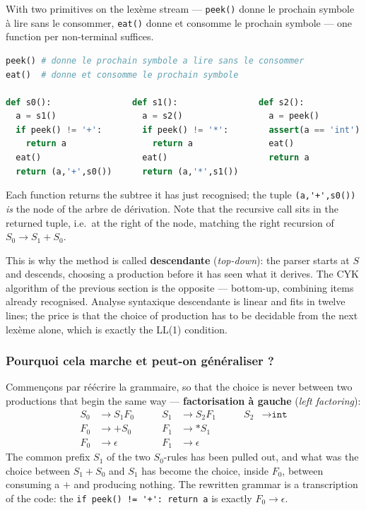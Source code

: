 \begin{example}
  With two primitives on the lexème stream --- \verb|peek()| donne le prochain
  symbole à lire sans le consommer, \verb|eat()| donne et consomme le prochain
  symbole --- one function per non-terminal suffices.

\begin{lstlisting}[language=Python]
peek() # donne le prochain symbole a lire sans le consommer
eat()  # donne et consomme le prochain symbole

def s0():                def s1():                def s2():
  a = s1()                 a = s2()                 a = peek()
  if peek() != '+':        if peek() != '*':        assert(a == 'int')
    return a                 return a               eat()
  eat()                    eat()                    return a
  return (a,'+',s0())      return (a,'*',s1())
\end{lstlisting}

  Each function returns the subtree it has just recognised; the tuple
  \verb|(a,'+',s0())| \emph{is} the node of the arbre de dérivation. Note that
  the recursive call sits in the returned tuple, i.e.\ at the right of the node,
  matching the right recursion of $S_{0} \to S_{1} + S_{0}$.
\end{example}

\begin{remark}
  This is why the method is called \textbf{descendante} (\textit{top-down}): the
  parser starts at $S$ and descends, choosing a production before it has seen
  what it derives. The CYK algorithm of the previous section is the opposite ---
  bottom-up, combining items already recognised. Analyse syntaxique descendante
  is linear and fits in twelve lines; the price is that the choice of production
  has to be decidable from the next lexème alone, which is exactly the LL(1)
  condition.
\end{remark}

\subsubsection{Pourquoi cela marche et peut-on généraliser ?}
Commençons par réécrire la grammaire, so that the choice is never between two
productions that begin the same way --- \textbf{factorisation à gauche}
(\textit{left factoring}):
\[
  \begin{aligned}
    S_{0} &\to S_{1}F_{0} & \qquad S_{1} &\to S_{2}F_{1} & \qquad S_{2} &\to \texttt{int} \\
    F_{0} &\to +S_{0}     & \qquad F_{1} &\to *S_{1}     &              & \\
    F_{0} &\to \epsilon   & \qquad F_{1} &\to \epsilon   &              &
  \end{aligned}
\]
The common prefix $S_{1}$ of the two $S_{0}$-rules has been pulled out, and what
was the choice between $S_{1} + S_{0}$ and $S_{1}$ has become the choice, inside
$F_{0}$, between consuming a $+$ and producing nothing. The rewritten grammar is
a transcription of the code: the \verb|if peek() != '+': return a| is exactly
$F_{0} \to \epsilon$.

